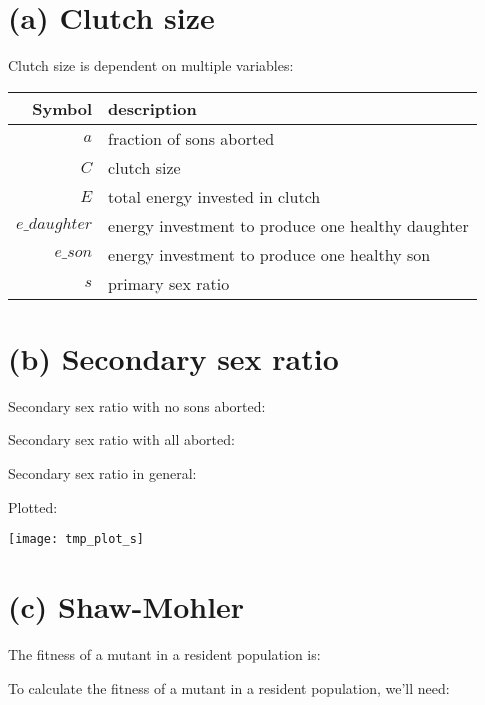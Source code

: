\documentclass[11]{article}
\begin{document}
\section{(a) Clutch size}

Clutch size is dependent on multiple variables:

\bigskip

\begin{tabular}{ | r | l | }
  \hline
  Symbol & description \\ 
  \hline
  $a$ & fraction of sons aborted \\
  $C$ & clutch size \\
  $E$ & total energy invested in clutch \\
  $e\_daughter$ & energy investment to produce one healthy daughter \\
  $e\_son$ & energy investment to produce one healthy son \\
  $s$ & primary sex ratio \\
  \hline
\end{tabular}

\bigskip




\section{(b) Secondary sex ratio}

Secondary sex ratio with no sons aborted:



Secondary sex ratio with all aborted:



Secondary sex ratio in general:



Plotted:

\texttt{[image: tmp\_plot\_s]}







\section{(c) Shaw-Mohler}

The fitness of a mutant in a resident population is:



To calculate the fitness of a mutant in a resident population, we'll need:
\end{document}
